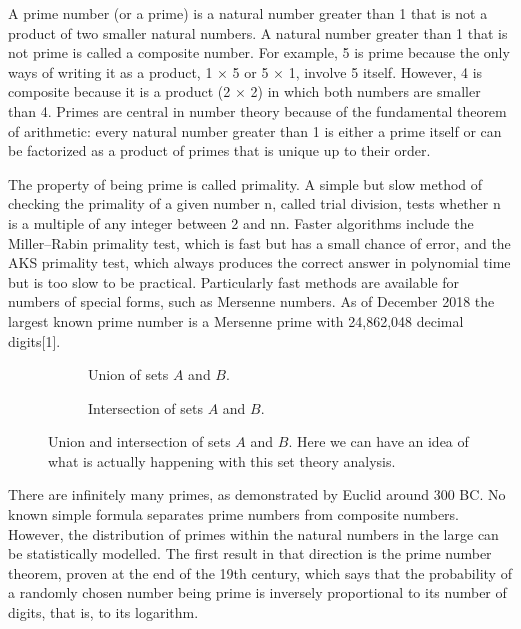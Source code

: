 A prime number (or a prime) is a natural number greater than 1 that is not a
product of two smaller natural numbers. A natural number greater than 1 that is
not prime is called a composite number. For example, 5 is prime because the only
ways of writing it as a product, 1 × 5 or 5 × 1, involve 5 itself. However, 4 is
composite because it is a product (2 × 2) in which both numbers are smaller than
4. Primes are central in number theory because of the fundamental theorem of
arithmetic: every natural number greater than 1 is either a prime itself or can
be factorized as a product of primes that is unique up to their order.

The property of being prime is called primality. A simple but slow method of
checking the primality of a given number n, called trial
division, tests whether n is a multiple of any integer between
2 and { { {n}}}{ {n}}. Faster algorithms include the
Miller–Rabin primality test, which is fast but has a small chance of error, and
the AKS primality test, which always produces the correct answer in polynomial
time but is too slow to be practical. Particularly fast methods are available
for numbers of special forms, such as Mersenne numbers. As of December 2018 the
largest known prime number is a Mersenne prime with 24,862,048 decimal
digits[1].

\begin{figure}[ht]
  \begin{subfigure}[b]{.5\textwidth}
    \centering
    
    \caption{Union of sets \(A\) and \(B\).}
  \end{subfigure}
  \begin{subfigure}[b]{.5\textwidth}
    \centering
    
    \caption{Intersection of sets \(A\) and \(B\).}
  \end{subfigure}
  \caption[asdf]{Union and intersection of sets \(A\) and \(B\). Here we can
    have an idea of what is actually happening with this set theory analysis.}
\end{figure}

There are infinitely many primes, as demonstrated by Euclid around 300 BC. No
known simple formula separates prime numbers from composite numbers. However,
the distribution of primes within the natural numbers in the large can be
statistically modelled. The first result in that direction is the prime number
theorem, proven at the end of the 19th century, which says that the probability
of a randomly chosen number being prime is inversely proportional to its number
of digits, that is, to its logarithm.


